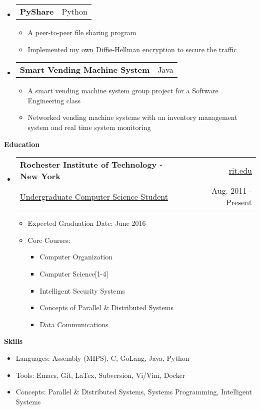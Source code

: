 \documentclass[letterpaper,11pt]{article}
\makeatletter
\newcommand{\resheading}[1]{{\large \colorbox{mygrey}{\begin{minipage}{\textwidth}{\textbf{#1 \vphantom{p\^{E}}}}\end{minipage}}}}
\newcommand{\ressubheading}[4]{
\begin{tabular*}{6.5in}{l@{\extracolsep{\fill}}r}
    \textbf{#1} & #2 \\
    {#3} & {#4} \\
\end{tabular*}\vspace{-6pt}}
\newcommand{\restwosubheading}[2]{
\begin{tabular*}{6.5in}{l@{\extracolsep{\fill}}r}
    \textbf{#1} & #2 \\
\end{tabular*}\vspace{-6pt}}
\makeatother
\begin{document}
\begin{itemize}
\begin{itemize}
      \end{itemize}
    \item
       \restwosubheading{PyShare}{Python}
       \begin{itemize}
   \item{A peer-to-peer file sharing program}
   \item{Implemented my own Diffie-Hellman encryption to secure the traffic}
       \end{itemize}
    \item
      \restwosubheading{Smart Vending Machine System}{Java}
      \begin{itemize}
  \item{A smart vending machine system group project for a Software Engineering class}
  \item{Networked vending machine systems with an inventory management system and real time system monitoring}
      \end{itemize}
  \end{itemize}

\resheading{Education}
  { \footnotesize
  \begin{itemize}
    \item
  \ressubheading{Rochester Institute of Technology - New York}{\href{http://www.rit.edu}{rit.edu}}{\href{http://www.cs.rit.edu/}{Undergraduate Computer Science Student}}{Aug. 2011 - Present}
  \footnotesize
        \begin{itemize}
  \item{Expected Graduation Date: June 2016}
  \item{Core Courses:}
    \begin{itemize}
      \item{Computer Organization}
      \item{Computer Science[1-4]}
      \item{Intelligent Security Systems}
      \item{Concepts of Parallel \& Distributed Systems}
      \item{Data Communications}
    \end{itemize}
  \end{itemize}
    \end{itemize} %
}



\resheading{{Skills}}
{ \footnotesize
  \begin{itemize}
    \item{Languages: Assembly (MIPS), C, GoLang, Java, Python}
    \item{Tools: Emacs, Git, LaTex, Subversion, Vi/Vim, Docker}
    \item{Concepts: Parallel \& Distributed Systems, Systems Programming, Intelligent Systems}
  \end{itemize}
}
\end{document}
